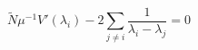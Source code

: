 \begin{equation}
 \tilde N \mu^{-1} V'(\lambda_i) -
2\sum_{j\neq i} \frac 1{\lambda_i-\lambda_j} = 0
\end{equation}

